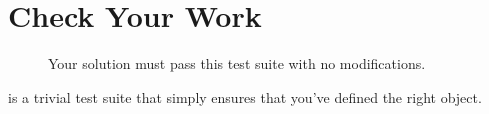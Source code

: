 \section{Check Your Work}

\begin{figure}
\caption{Your solution must pass this test suite with no modifications.}
\label{regex_trivial_tests}
\end{figure}

 is a trivial test suite that simply ensures that you've defined the right object.

